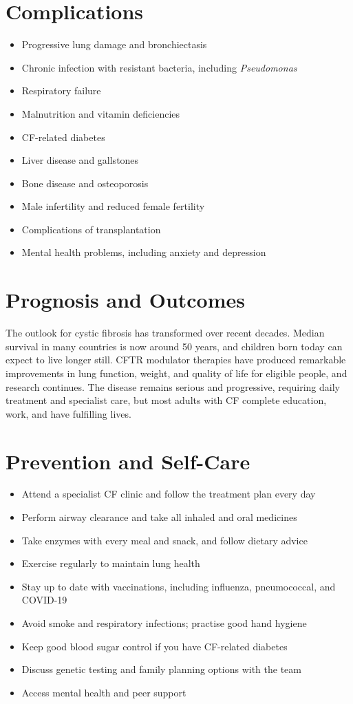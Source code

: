 \section*{Complications}
\begin{itemize}
    \item Progressive lung damage and bronchiectasis
    \item Chronic infection with resistant bacteria, including \textit{Pseudomonas}
    \item Respiratory failure
    \item Malnutrition and vitamin deficiencies
    \item CF-related diabetes
    \item Liver disease and gallstones
    \item Bone disease and osteoporosis
    \item Male infertility and reduced female fertility
    \item Complications of transplantation
    \item Mental health problems, including anxiety and depression
\end{itemize}

\section*{Prognosis and Outcomes}
The outlook for cystic fibrosis has transformed over recent decades. Median survival in many countries is now around 50 years, and children born today can expect to live longer still. CFTR modulator therapies have produced remarkable improvements in lung function, weight, and quality of life for eligible people, and research continues. The disease remains serious and progressive, requiring daily treatment and specialist care, but most adults with CF complete education, work, and have fulfilling lives.

\section*{Prevention and Self-Care}
\begin{itemize}
    \item Attend a specialist CF clinic and follow the treatment plan every day
    \item Perform airway clearance and take all inhaled and oral medicines
    \item Take enzymes with every meal and snack, and follow dietary advice
    \item Exercise regularly to maintain lung health
    \item Stay up to date with vaccinations, including influenza, pneumococcal, and COVID-19
    \item Avoid smoke and respiratory infections; practise good hand hygiene
    \item Keep good blood sugar control if you have CF-related diabetes
    \item Discuss genetic testing and family planning options with the team
    \item Access mental health and peer support
\end{itemize}

